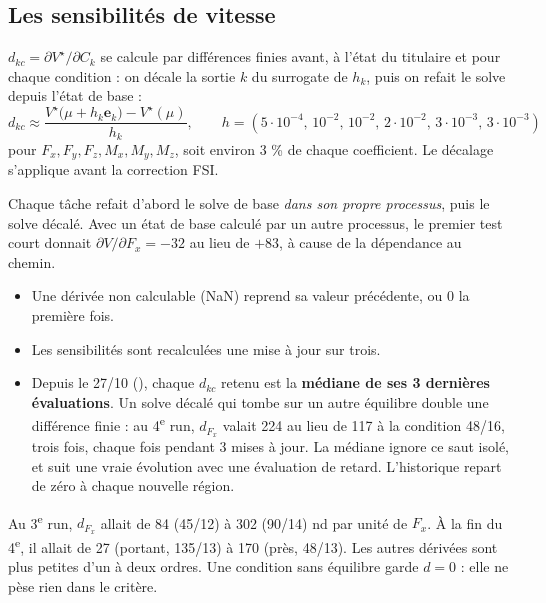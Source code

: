 \documentclass[10pt,a4paper]{article}
\begin{document}
\subsection{Les sensibilités de vitesse}
\label{sec:sensibilites}
$d_{kc}=\partial V^\star/\partial C_k$ se calcule par différences finies avant, à l'état du titulaire et pour
chaque condition : on décale la sortie $k$ du surrogate de $h_k$, puis on refait le solve depuis l'état de
base :
\[
  d_{kc} \approx \frac{V^\star\big(\mu+h_k\bm{e}_k\big) - V^\star(\mu)}{h_k},\qquad
  h = (5\cdot10^{-4},\,10^{-2},\,10^{-2},\,2\cdot10^{-2},\,3\cdot10^{-3},\,3\cdot10^{-3})
\]
pour $F_x,F_y,F_z,M_x,M_y,M_z$, soit environ 3 \% de chaque coefficient. Le décalage s'applique avant la
correction FSI.

\begin{danslecode}
Chaque tâche refait d'abord le solve de base \emph{dans son propre processus}, puis le solve décalé. Avec un
état de base calculé par un autre processus, le premier test court donnait $\partial V/\partial F_x=-32$ au
lieu de $+83$, à cause de la dépendance au chemin.
\begin{itemize}
  \item Une dérivée non calculable (NaN) reprend sa valeur précédente, ou 0 la première fois.
  \item Les sensibilités sont recalculées une mise à jour sur trois.
  \item Depuis le 27/10 (), chaque $d_{kc}$ retenu est la \textbf{médiane de ses
        3 dernières évaluations}. Un solve décalé qui tombe sur un autre équilibre double une différence finie :
        au 4\textsuperscript{e} run, $d_{F_x}$ valait 224 au lieu de 117 à la condition 48/16, trois fois,
        chaque fois pendant 3 mises à jour. La médiane ignore ce saut isolé, et suit une vraie évolution
        avec une évaluation de retard. L'historique repart de zéro à chaque nouvelle région.
\end{itemize}
Au 3\textsuperscript{e} run, $d_{F_x}$ allait de 84 (45/12) à 302 (90/14) nd par unité de $F_x$. À la fin
du 4\textsuperscript{e}, il allait de 27 (portant, 135/13) à 170 (près, 48/13). Les autres dérivées sont
plus petites d'un à deux ordres. Une condition sans équilibre garde $d=0$ : elle ne pèse rien dans le
critère.
\end{danslecode}

\end{document}
